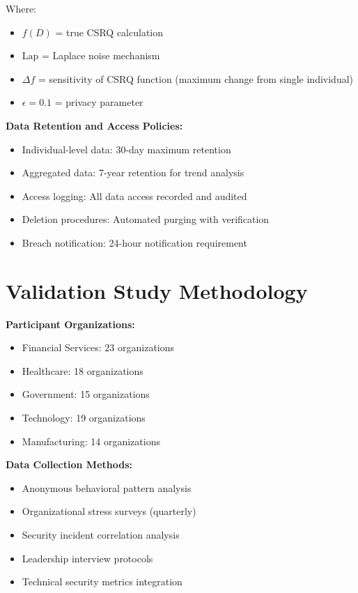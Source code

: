 \documentclass[11pt,a4paper]{article}
\begin{document}
Where:
\begin{itemize}
\item $f(D)$ = true CSRQ calculation
\item $\text{Lap}$ = Laplace noise mechanism
\item $\Delta f$ = sensitivity of CSRQ function (maximum change from single individual)
\item $\epsilon = 0.1$ = privacy parameter
\end{itemize}

\textbf{Data Retention and Access Policies:}
\begin{itemize}
\item Individual-level data: 30-day maximum retention
\item Aggregated data: 7-year retention for trend analysis
\item Access logging: All data access recorded and audited
\item Deletion procedures: Automated purging with verification
\item Breach notification: 24-hour notification requirement
\end{itemize}

\section{Validation Study Methodology}
\label{app:validation}

\textbf{Participant Organizations:}
\begin{itemize}
\item Financial Services: 23 organizations
\item Healthcare: 18 organizations
\item Government: 15 organizations
\item Technology: 19 organizations
\item Manufacturing: 14 organizations
\end{itemize}

\textbf{Data Collection Methods:}
\begin{itemize}
\item Anonymous behavioral pattern analysis
\item Organizational stress surveys (quarterly)
\item Security incident correlation analysis
\item Leadership interview protocols
\item Technical security metrics integration
\end{itemize}
\end{document}
